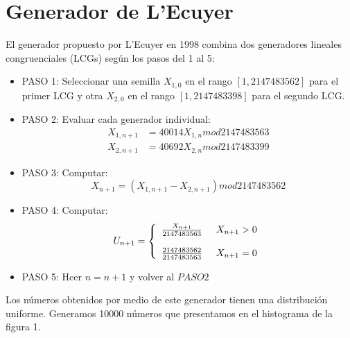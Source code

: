 \documentclass[10pt,journal,compsoc]{IEEEtran}
\begin{document}
\section{Generador de L'Ecuyer}
El generador propuesto por L'Ecuyer en 1998 combina dos generadores lineales congruenciales (LCGs)
seg\'un los pasos del 1 al 5:
\begin{itemize}
 \item{PASO 1:} Seleccionar una semilla $X_{1,0}$ en el rango $[1,2147483562]$ para el primer LCG y otra $X_{2,0}$ en el rango $[1,2147483398]$ para el segundo LCG.\\
 \item{PASO 2:} Evaluar cada generador individual:
 \begin{align*}
  X_{1,n+1} &= 40014 X_{1,n} mod 2147483563\\
  X_{2,n+1} &= 40692 X_{2,n} mod 2147483399
 \end{align*}
 
 \item{PASO 3:} Computar:
 \begin{equation*}
  X_{n+1} = (X_{1,n+1} - X_{2,n+1}) mod 2147483562
 \end{equation*}
 
 \item{PASO 4:} Computar:
  \begin{equation*}
  \label{eq:f(t)}
  U_{n+1} = \left\{
  \begin{array}{rl}
	\frac{X_{n+1}}{2147483563} \hspace{0.5cm} X_{n+1} > 0\\\\
	\frac{2147483562}{2147483563} \hspace{0.5cm} X_{n+1} = 0\\
  \end{array} \right.
  \end{equation*}

 \item{PASO 5:} Hcer $n = n + 1$ y volver al $PASO 2$
\end{itemize}

Los n\'umeros obtenidos por medio de este generador tienen una distribuci\'on uniforme.
Generamos 10000 n\'umeros que presentamos en el histograma de la figura 1.
\end{document}
